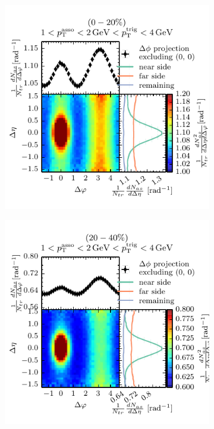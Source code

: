 \begin{figure}
  \centering
  \begin{subfigure}[b]{0.5\textwidth}
    \includegraphics[]{figures/12_24_class0.pdf}
  \end{subfigure}%
  \begin{subfigure}[b]{0.5\textwidth}
    \includegraphics[]{figures/12_24_class1.pdf}
  \end{subfigure}
  \begin{subfigure}[b]{0.5\textwidth}

\end{subfigure}
\end{figure}
